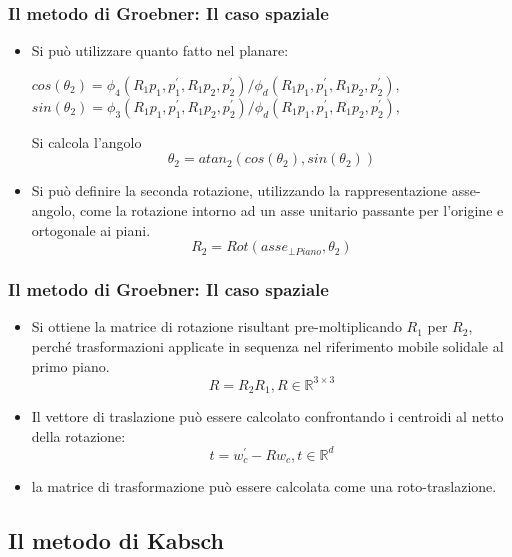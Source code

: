 \documentclass{beamer}
\begin{document}
\begin{frame}
\frametitle{Il metodo di Groebner: Il caso spaziale}
\begin{itemize}
	\item Si può utilizzare quanto fatto nel planare:
	\begin{center}
		$cos(\theta_2) = \phi_4(R_1p_1, p_1^{'}, R_1p_2, p_2^{'})/\phi_d(R_1p_1, p_1^{'}, R_1p_2, p_2^{'}), \,\,$\\
		$sin(\theta_2) = \phi_3(R_1p_1, p_1^{'}, R_1p_2, p_2^{'})/\phi_d(R_1p_1, p_1^{'}, R_1p_2, p_2^{'}),$
	\end{center} 
	Si calcola l'angolo
	\begin{equation}
	\theta_2 = atan_2(cos(\theta_2), sin(\theta_2))
	\end{equation} 
	\item Si può definire la seconda rotazione, utilizzando la rappresentazione asse-angolo, come la rotazione intorno ad un asse unitario passante per l'origine e ortogonale ai piani.
	\begin{equation}
	R_2 = Rot(asse_{\bot Piano}, \theta_2)
	\end{equation} 
\end{itemize}
\end{frame}

\begin{frame}
\frametitle{Il metodo di Groebner: Il caso spaziale}
\begin{itemize}
	\item Si ottiene la matrice di rotazione risultant pre-moltiplicando $R_1$ per $R_2$, perché trasformazioni applicate in sequenza nel riferimento mobile solidale al primo piano.
	\begin{equation}
	R = R_2R_1, R \in \mathbb{R}^{3 \times 3}
	\end{equation}
	\item Il vettore di traslazione può essere calcolato confrontando i centroidi al netto della rotazione:
	\begin{equation}
	t = w_c^{'} - Rw_c, t \in \mathbb{R}^d
	\end{equation}
	\item la matrice di trasformazione può essere calcolata come una roto-traslazione.
\end{itemize}
\end{frame}

\subsection{Il metodo di Kabsch}
\end{document}
